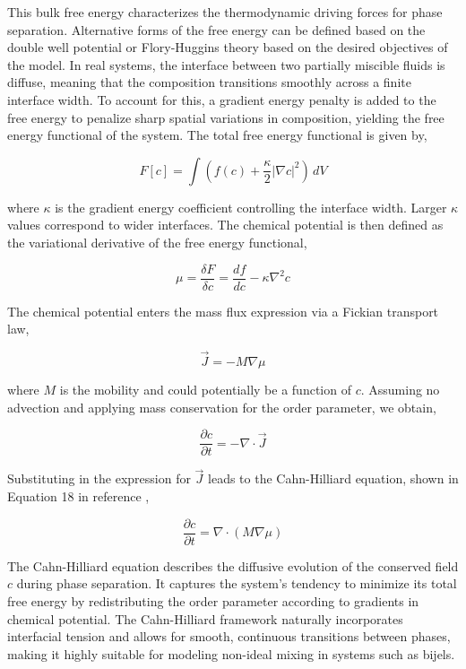 This bulk free energy characterizes the thermodynamic driving forces for phase separation. Alternative forms of the free energy can be defined based on the double well potential or
Flory-Huggins theory based on the desired objectives of the model. In real systems, the interface between two partially miscible fluids is diffuse, meaning that the composition 
transitions smoothly across a finite interface width. To account for this, a gradient energy penalty is added to the free energy to penalize sharp spatial variations in 
composition, yielding the free energy functional of the system. The total free energy functional is given by,

\begin{equation}
    F[c] = \int \left( f(c) + \frac{\kappa}{2}|\nabla c|^2 \right) \, dV
\end{equation}

where $\kappa$ is the gradient energy coefficient controlling the interface width. Larger \(\kappa\) values correspond to wider interfaces.
The chemical potential is then defined as the variational derivative of the free energy functional,

\begin{equation}
    \mu = \frac{\delta F}{\delta c} = \frac{df}{dc} - \kappa \nabla^2 c
\end{equation}

The chemical potential enters the mass flux expression via a Fickian transport law,

\begin{equation}
    \vec{J} = -M \nabla \mu
\end{equation}

where $M$ is the mobility and could potentially be a function of $c$. Assuming no advection and applying mass conservation for the order parameter, we obtain,

\begin{equation}
    \frac{\partial c}{\partial t} = -\nabla \cdot \vec{J}
\end{equation}

Substituting in the expression for \(\vec{J}\) leads to the Cahn-Hilliard equation, shown in Equation 18 in reference \cite{cahn_spinodal_1961},

\begin{equation}
    \frac{\partial c}{\partial t} = \nabla \cdot \left( M \nabla \mu \right)
\end{equation}

The Cahn-Hilliard equation describes the diffusive evolution of the conserved field $c$ during phase separation. It captures the system's tendency to minimize its total free energy 
by redistributing the order parameter according to gradients in chemical potential. The Cahn-Hilliard framework naturally incorporates interfacial tension and allows for smooth, 
continuous transitions between phases, making it highly suitable for modeling non-ideal mixing in systems such as bijels.

